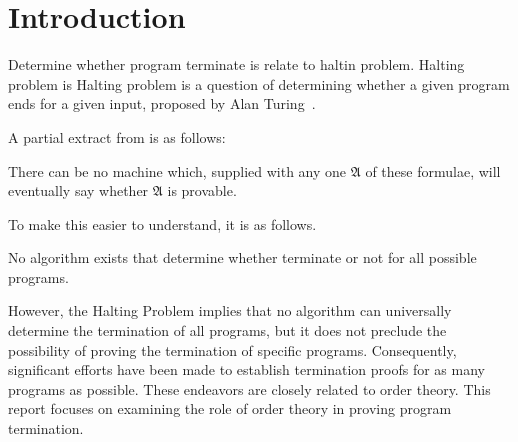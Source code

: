 \section{Introduction}
\label{sec:preliminaries}
Determine whether program terminate is relate to haltin problem.
Halting problem is 
Halting problem is a question of determining whether a given program ends for a given input, proposed by Alan Turing~\cite{turing}.

A partial extract from \cite{turing} is as follows:
\begin{theorem}
    There can be no machine which, supplied with any one
$\mathfrak{A}$ of these formulae, will eventually say whether $\mathfrak{A}$ is provable.
\end{theorem}

To make this easier to understand, it is as follows.
\begin{theorem}
    No algorithm exists that determine whether terminate or not for all possible programs.
\end{theorem}

However, the Halting Problem implies that no algorithm can universally determine the termination of all programs, but it does not preclude the possibility of proving the termination of specific programs.
Consequently, significant efforts have been made to establish termination proofs for as many programs as possible.
These endeavors are closely related to order theory.
This report focuses on examining the role of order theory in proving program termination.